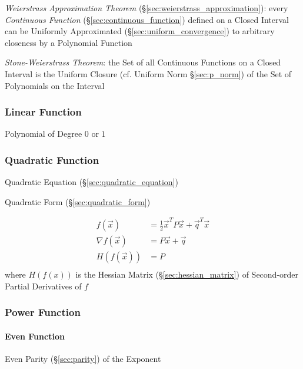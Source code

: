 \emph{Weierstrass Approximation Theorem}
(\S\ref{sec:weierstrass_approximation}): every \emph{Continuous Function}
(\S\ref{sec:continuous_function}) defined on a Closed Interval can be Uniformly
Approximated (\S\ref{sec:uniform_convergence}) to arbitrary closeness by a
Polynomial Function

\emph{Stone-Weierstrass Theorem}: the Set of all Continuous Functions on a
Closed Interval is the Uniform Closure (cf. Uniform Norm \S\ref{sec:p_norm}) of
the Set of Polynomials on the Interval



\subsubsection{Linear Function}\label{sec:linear_function}

Polynomial of Degree $0$ or $1$



\subsubsection{Quadratic Function}\label{sec:quadratic_function}

\fist Quadratic Equation (\S\ref{sec:quadratic_equation})

\fist Quadratic Form (\S\ref{sec:quadratic_form})

\begin{align*}
  f(\vec{x})        & = \frac{1}{2}\vec{x}^T P \vec{x} + \vec{q}^T\vec{x} \\
  \nabla f(\vec{x}) & = P\vec{x} + \vec{q} \\
  H(f(\vec{x}))     & = P \\
\end{align*}
where $H(f(x))$ is the Hessian Matrix (\S\ref{sec:hessian_matrix}) of
Second-order Partial Derivatives of $f$



\subsubsection{Power Function}\label{sec:power_function}


\paragraph{Even Function}\label{sec:even_function}\hfill

Even Parity (\S\ref{sec:parity}) of the Exponent



